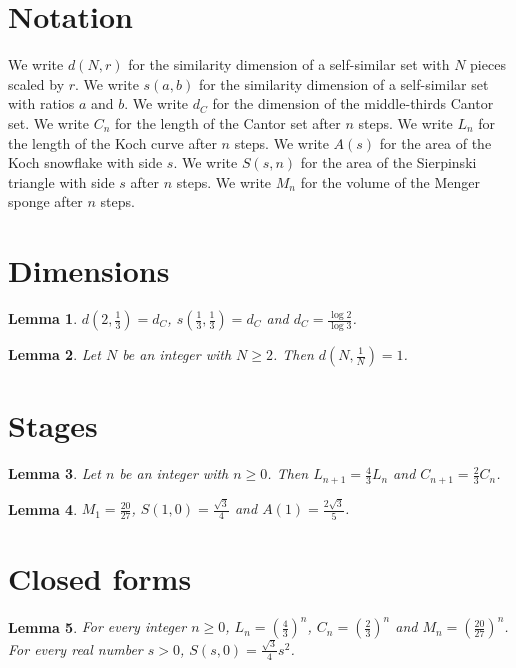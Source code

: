 \documentclass{article}
\newtheorem{lemma}{Lemma}
\begin{document}
\section{Notation}

We write $d(N,r)$ for the similarity dimension of a self-similar set with $N$ pieces scaled by $r$.
We write $s(a,b)$ for the similarity dimension of a self-similar set with ratios $a$ and $b$.
We write $d_C$ for the dimension of the middle-thirds Cantor set.
We write $C_n$ for the length of the Cantor set after $n$ steps.
We write $L_n$ for the length of the Koch curve after $n$ steps.
We write $A(s)$ for the area of the Koch snowflake with side $s$.
We write $S(s,n)$ for the area of the Sierpinski triangle with side $s$ after $n$ steps.
We write $M_n$ for the volume of the Menger sponge after $n$ steps.

\section{Dimensions}

\begin{lemma}\label{cantor}
$d(2,\frac13)=d_C$, $s(\frac13,\frac13)=d_C$ and $d_C=\frac{\log 2}{\log 3}$.
\end{lemma}

\begin{lemma}\label{full}
Let $N$ be an integer with $N\ge2$. Then $d(N,\frac1N)=1$.
\end{lemma}

\section{Stages}

\begin{lemma}\label{stages}
Let $n$ be an integer with $n\ge0$. Then $L_{n+1}=\frac43 L_n$ and $C_{n+1}=\frac23 C_n$.
\end{lemma}

\begin{lemma}\label{values}
$M_1=\frac{20}{27}$, $S(1,0)=\frac{\sqrt{3}}{4}$ and $A(1)=\frac{2\sqrt{3}}{5}$.
\end{lemma}

\section{Closed forms}

\begin{lemma}\label{closed}
For every integer $n\ge0$, $L_n=(\frac43)^n$, $C_n=(\frac23)^n$ and $M_n=(\frac{20}{27})^n$. For every real number $s>0$, $S(s,0)=\frac{\sqrt3}{4}s^2$.
\end{lemma}
\end{document}
